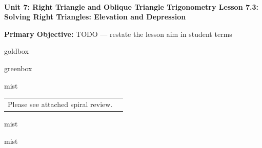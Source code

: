 \documentclass[10pt]{article}
\newcommand{\UnitNumberName}{Unit 7: Right Triangle and Oblique Triangle Trigonometry \quad}
\newcommand{\LessonNumberName}{Lesson 7.3: Solving Right Triangles: Elevation and Depression}
\begin{document}
\begin{center}
    {\Large\bfseries \CourseName \\
    {\small\bfseries \UnitNumberName \LessonNumberName}}
\end{center}

\begin{tcolorbox}[colback=mist, colframe=royal, boxrule=0.9pt, arc=2mm,
    left=2mm, right=2mm, top=1.5mm, bottom=1.5mm]
    \textbf{Primary Objective:} TODO --- restate the lesson aim in student terms
\end{tcolorbox}

\renewcommand{\arraystretch}{1.6}
\begin{skillbox}{goldbox}
\end{skillbox}

\begin{skillbox}{greenbox}
\end{skillbox}

\begin{fixedskillbox}{mist}
    \begin{tabularx}{\linewidth}{@{}X c@{}}
        \begin{minipage}[t]{0.55\linewidth}\vspace{0pt}
            Please see attached spiral review.  %
        \end{minipage}
        &
        \begin{minipage}[t]{0.38\linewidth}\vspace{0pt}\centering
        \end{minipage}
    \end{tabularx}
\end{fixedskillbox}

\begin{skillbox}[Hook]{mist}
\end{skillbox}

\begin{skillbox}[Lesson]{mist}
\end{skillbox}
\end{document}
